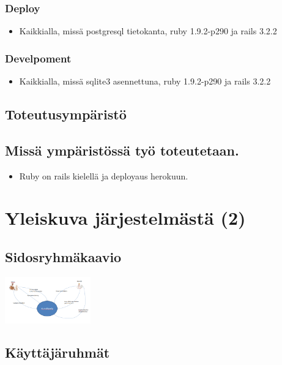 \documentclass[11pt]{article}
\begin{document}
\subsubsection{Deploy}
\label{sec-1.3.1}

\begin{itemize}
\item Kaikkialla, missä postgresql tietokanta, ruby 1.9.2-p290 ja rails 3.2.2
\end{itemize}
\subsubsection{Develpoment}
\label{sec-1.3.2}

\begin{itemize}
\item Kaikkialla, missä sqlite3 asennettuna, ruby 1.9.2-p290 ja rails 3.2.2
\end{itemize}
\subsection{Toteutusympäristö}
\label{sec-1.4}

\subsection{Missä ympäristössä työ toteutetaan.}
\label{sec-1.5}

\begin{itemize}
\item Ruby on rails kielellä ja deployaus herokuun.
\end{itemize}
\section{Yleiskuva järjestelmästä (2)}
\label{sec-2}

\subsection{Sidosryhmäkaavio}
\label{sec-2.1}

   \includegraphics[width=10em]{sidosryhmakaavio.png}
\subsection{Käyttäjäruhmät}
\label{sec-2.2}
\end{document}
